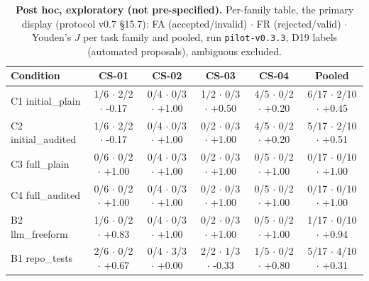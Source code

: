 \begin{table}[t]\centering\footnotesize
\caption{\textbf{Post hoc, exploratory (not pre-specified).} Per-family table, the primary display (protocol v0.7 \S15.7): FA (accepted/invalid) $\cdot$ FR (rejected/valid) $\cdot$ Youden's $J$ per task family and pooled, run \texttt{pilot-v0.3.3}, D19 labels (automated proposals), ambiguous excluded.}\label{tab:expl-per-family}
\begin{tabular}{lccccc}\toprule Condition & CS-01 & CS-02 & CS-03 & CS-04 & Pooled \\\midrule
C1 initial\_plain & 1/6 $\cdot$ 2/2 $\cdot$ -0.17 & 0/4 $\cdot$ 0/3 $\cdot$ +1.00 & 1/2 $\cdot$ 0/3 $\cdot$ +0.50 & 4/5 $\cdot$ 0/2 $\cdot$ +0.20 & 6/17 $\cdot$ 2/10 $\cdot$ +0.45 \\
C2 initial\_audited & 1/6 $\cdot$ 2/2 $\cdot$ -0.17 & 0/4 $\cdot$ 0/3 $\cdot$ +1.00 & 0/2 $\cdot$ 0/3 $\cdot$ +1.00 & 4/5 $\cdot$ 0/2 $\cdot$ +0.20 & 5/17 $\cdot$ 2/10 $\cdot$ +0.51 \\
C3 full\_plain & 0/6 $\cdot$ 0/2 $\cdot$ +1.00 & 0/4 $\cdot$ 0/3 $\cdot$ +1.00 & 0/2 $\cdot$ 0/3 $\cdot$ +1.00 & 0/5 $\cdot$ 0/2 $\cdot$ +1.00 & 0/17 $\cdot$ 0/10 $\cdot$ +1.00 \\
C4 full\_audited & 0/6 $\cdot$ 0/2 $\cdot$ +1.00 & 0/4 $\cdot$ 0/3 $\cdot$ +1.00 & 0/2 $\cdot$ 0/3 $\cdot$ +1.00 & 0/5 $\cdot$ 0/2 $\cdot$ +1.00 & 0/17 $\cdot$ 0/10 $\cdot$ +1.00 \\
B2 llm\_freeform & 1/6 $\cdot$ 0/2 $\cdot$ +0.83 & 0/4 $\cdot$ 0/3 $\cdot$ +1.00 & 0/2 $\cdot$ 0/3 $\cdot$ +1.00 & 0/5 $\cdot$ 0/2 $\cdot$ +1.00 & 1/17 $\cdot$ 0/10 $\cdot$ +0.94 \\
B1 repo\_tests & 2/6 $\cdot$ 0/2 $\cdot$ +0.67 & 0/4 $\cdot$ 3/3 $\cdot$ +0.00 & 2/2 $\cdot$ 1/3 $\cdot$ -0.33 & 1/5 $\cdot$ 0/2 $\cdot$ +0.80 & 5/17 $\cdot$ 4/10 $\cdot$ +0.31 \\
\bottomrule\end{tabular}\end{table}
